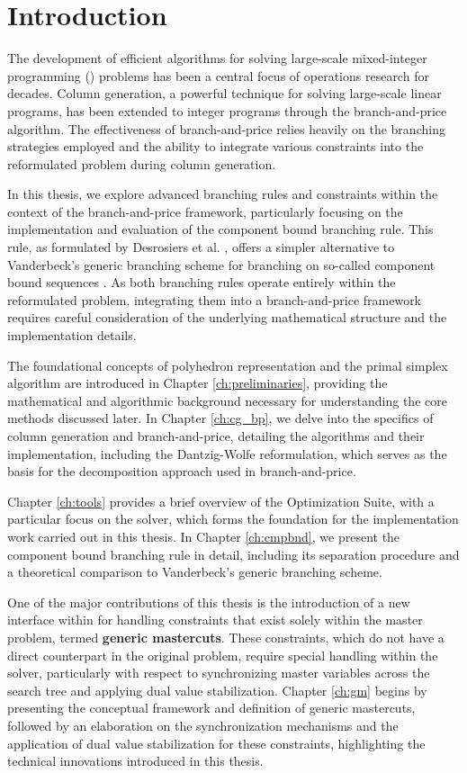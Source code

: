 \chapter{Introduction}
The development of efficient algorithms for solving large-scale mixed-integer programming (\MIP{}) problems has been a central focus of operations research for decades. Column generation, a powerful technique for solving large-scale linear programs, has been extended to integer programs through the branch-and-price algorithm. The effectiveness of branch-and-price relies heavily on the branching strategies employed and the ability to integrate various constraints into the reformulated problem during column generation.

In this thesis, we explore advanced branching rules and constraints within the context of the branch-and-price framework, particularly focusing on the implementation and evaluation of the component bound branching rule. This rule, as formulated by Desrosiers et al. \cite{thebook}, offers a simpler alternative to Vanderbeck's generic branching scheme \cite{vanderbeck2011branching} for branching on so-called component bound sequences \cite{vanderbeck1996exact}. As both branching rules operate entirely within the reformulated problem, integrating them into a branch-and-price framework requires careful consideration of the underlying mathematical structure and the implementation details.

The foundational concepts of polyhedron representation and the primal simplex algorithm are introduced in Chapter \ref{ch:preliminaries}, providing the mathematical and algorithmic background necessary for understanding the core methods discussed later. In Chapter \ref{ch:cg_bp}, we delve into the specifics of column generation and branch-and-price, detailing the algorithms and their implementation, including the Dantzig-Wolfe reformulation, which serves as the basis for the decomposition approach used in branch-and-price.

Chapter \ref{ch:tools} provides a brief overview of the \SCIP{} Optimization Suite, with a particular focus on the \GCG{} solver, which forms the foundation for the implementation work carried out in this thesis. In Chapter \ref{ch:cmpbnd}, we present the component bound branching rule in detail, including its separation procedure and a theoretical comparison to Vanderbeck's generic branching scheme.

One of the major contributions of this thesis is the introduction of a new interface within \GCG{} for handling constraints that exist solely within the master problem, termed \textbf{generic mastercuts}. These constraints, which do not have a direct counterpart in the original problem, require special handling within the solver, particularly with respect to synchronizing master variables across the search tree and applying dual value stabilization. Chapter \ref{ch:gm} begins by presenting the conceptual framework and definition of generic mastercuts, followed by an elaboration on the synchronization mechanisms and the application of dual value stabilization for these constraints, highlighting the technical innovations introduced in this thesis.

